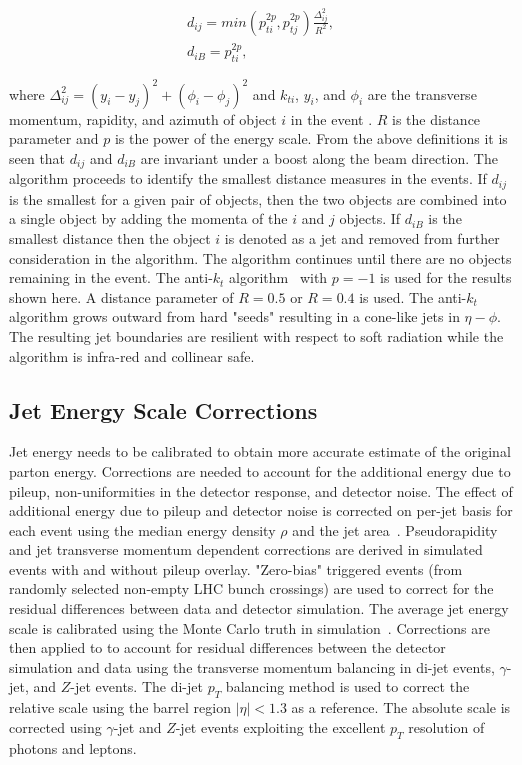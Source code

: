 \begin{eqnarray} \label{eq:jet_find}
d_{ij} = min(p_{ti}^{2p},p_{tj}^{2p})\frac{\Delta_{ij}^2}{R^2}, \\
d_{iB} = p_{ti}^{2p},
\end{eqnarray}

where $\Delta_{ij}^2 = (y_{i}-y_{j})^2 + (\phi_{i} -\phi_{j})^2$ and $k_{ti}$, $y_{i}$, and $\phi_{i}$ are the transverse momentum, rapidity, and azimuth of object $i$ in the event . $R$ is the distance parameter and $p$ is the power of the energy scale. From the above definitions it is seen that $d_{ij}$ and $d_{iB}$ are invariant under a boost along the beam direction. The algorithm proceeds to identify the smallest distance measures in the events. If $d_{ij}$ is the smallest for a given pair of objects, then the two objects are combined into a single object by adding the momenta of the $i$ and $j$ objects. If $d_{iB}$ is the smallest distance then the object $i$ is denoted as a jet and removed from further consideration in the algorithm. The algorithm continues until there are no objects remaining in the event. The anti-$k_{t}$ algorithm~\cite{Cacciari:2008gp} with $p=-1$ is used for the results shown here. A distance parameter of $R=0.5$ or $R=0.4$ is used. The anti-${k_{t}}$ algorithm grows outward from hard "seeds" resulting in a cone-like jets in $\eta-\phi$. The resulting jet boundaries are resilient with respect to soft radiation while the algorithm is infra-red and collinear safe.  


\subsection{Jet Energy Scale Corrections}

Jet energy needs to be calibrated to obtain more accurate estimate of the original parton energy. Corrections are needed to account for the additional energy due to pileup, non-uniformities in the detector response, and detector noise. The effect of additional energy due to pileup and detector noise is corrected on per-jet basis for each event using the median energy density $\rho$ and the jet area~\cite{Cacciari:2007fd}. Pseudorapidity and jet transverse momentum dependent corrections are derived in simulated events with and without pileup overlay. "Zero-bias" triggered events (from randomly selected non-empty LHC bunch crossings) are used to correct for the residual differences between data and detector simulation.  The average jet energy scale is calibrated using the Monte Carlo truth in simulation~\cite{1748-0221-6-11-P11002,Khachatryan:2016kdb}. Corrections are then applied to to account for residual differences  between the detector simulation and data using the transverse momentum balancing in di-jet events, $\gamma$-jet, and $Z$-jet events. The di-jet $p_{T}$ balancing method is used to correct the relative scale using the barrel region $|\eta|<1.3$ as a reference. The absolute scale is corrected using $\gamma$-jet and $Z$-jet events exploiting the excellent $p_{T}$ resolution of photons and leptons. 

